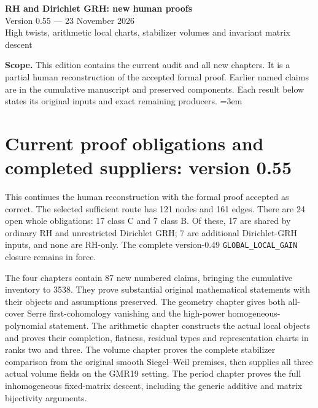 \documentclass[11pt,a4paper]{article}
\numberwithin{equation}{section}
\theoremstyle{remark}\newtheorem{remark}[theorem]{Remark}
\begin{document}
\begin{center}
{\LARGE\bfseries RH and Dirichlet GRH: new human proofs}\\[7pt]
{\large Version 0.55 --- 23 November 2026}\\[5pt]
{\large High twists, arithmetic local charts, stabilizer volumes and invariant matrix descent}
\end{center}
\textbf{Scope.} This edition contains the current audit and all new chapters.
It is a partial human reconstruction of the accepted formal proof.
Earlier named claims are in the cumulative manuscript and preserved components.
Each result below states its original inputs and exact remaining producers.
\setcounter{tocdepth}{1}
\tableofcontents
\clearpage
\begingroup\emergencystretch=3em
\section{Current proof obligations and completed suppliers: version 0.55}
\label{sec:dependency-audit-v55}

This continues the human reconstruction with the formal proof accepted
as correct. The selected sufficient route has 121 nodes and 161 edges.
There are 24 open whole obligations: 17 class C and 7 class B.
Of these, 17 are shared by ordinary RH and unrestricted Dirichlet
GRH; 7 are additional Dirichlet-GRH inputs, and none are RH-only.
The complete version-0.49 \texttt{GLOBAL\_\allowbreak LOCAL\_\allowbreak GAIN} closure remains
in force.

The four chapters contain 87 new numbered claims, bringing the
cumulative inventory to 3538. They prove substantial original
mathematical statements with their objects and assumptions preserved.
The geometry chapter gives both all-cover Serre first-cohomology
vanishing and the high-power homogeneous-polynomial statement.
The arithmetic chapter constructs the actual local objects and proves
their completion, flatness, residual types and representation charts
in ranks two and three. The volume chapter proves the complete
stabilizer comparison from the original smooth Siegel--Weil premises,
then supplies all three actual volume fields on the GMR19 setting.
The period chapter proves the full inhomogeneous fixed-matrix descent,
including the generic additive and matrix bijectivity arguments.
\end{document}
